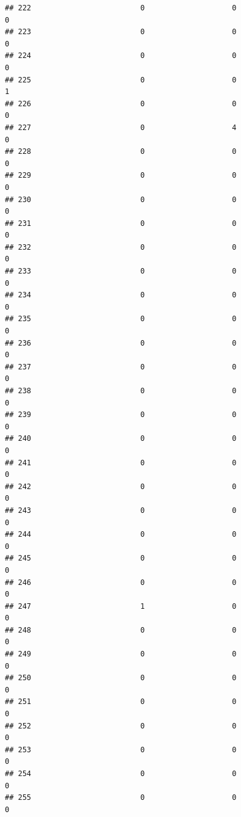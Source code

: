 \documentclass[
]{article}
\begin{document}
\begin{verbatim}
## 222                         0                    0                      0
## 223                         0                    0                      0
## 224                         0                    0                      0
## 225                         0                    0                      1
## 226                         0                    0                      0
## 227                         0                    4                      0
## 228                         0                    0                      0
## 229                         0                    0                      0
## 230                         0                    0                      0
## 231                         0                    0                      0
## 232                         0                    0                      0
## 233                         0                    0                      0
## 234                         0                    0                      0
## 235                         0                    0                      0
## 236                         0                    0                      0
## 237                         0                    0                      0
## 238                         0                    0                      0
## 239                         0                    0                      0
## 240                         0                    0                      0
## 241                         0                    0                      0
## 242                         0                    0                      0
## 243                         0                    0                      0
## 244                         0                    0                      0
## 245                         0                    0                      0
## 246                         0                    0                      0
## 247                         1                    0                      0
## 248                         0                    0                      0
## 249                         0                    0                      0
## 250                         0                    0                      0
## 251                         0                    0                      0
## 252                         0                    0                      0
## 253                         0                    0                      0
## 254                         0                    0                      0
## 255                         0                    0                      0

\end{verbatim}
\end{document}
